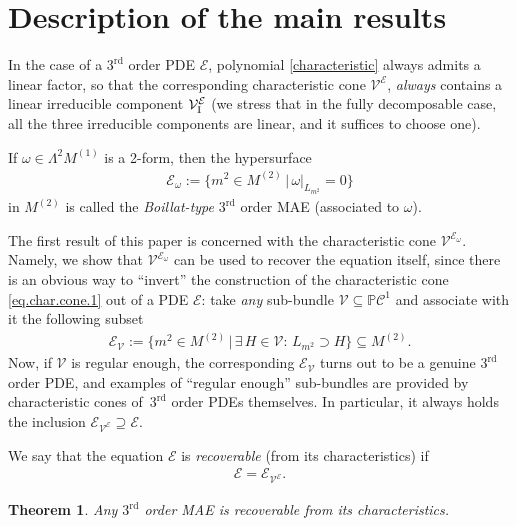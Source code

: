 \documentclass[10pt,a4paper]{amsart}
\newcommand{\C}{\mathcal{C}}
\newcommand{\M}{\mathcal{V}}
\newcommand{\MM}{\mathcal{V}_{\textrm{\normalfont I}}}
\newcommand{\E}{\mathcal{E}}
\renewcommand{\P}{\mathbb{P}}
\newcommand{\Rd}{^\textrm{rd}}
\newcommand{\elle}{H}
\numberwithin{equation}{section}
\newtheorem{Theorem}{Theorem}[section]
\begin{document}
\section{Description of the main results}\label{subDescrMainRes}

In the case of a $3\Rd$ order PDE $\E$, polynomial \eqref{characteristic} always admits a linear factor, so that the corresponding characteristic cone $\M^\E$, \emph{always} contains a linear irreducible component $\MM^\E$ (we stress that in the fully decomposable case, all the three irreducible components are linear, and it suf\/f\/ices to choose one).

\begin{Definition}
 If $\omega\in \Lambda^2 M^{(1)}$ is a 2-form, then the hypersurface
 \begin{gather}\label{eqEOmega}
\E_{\omega}:=\big\{ m^2\in M^{(2)}\,|\, \omega|_{L_{m^2}}= 0 \big\}
\end{gather}
in $M^{(2)}$ is called the \emph{Boillat-type} $3\Rd$ order MAE (associated to $\omega$).
\end{Definition}

The f\/irst result of this paper is concerned with the characteristic cone $\M^{\E_\omega}$. %
 Namely, we show that $\M^{\E_\omega}$ can be used to recover the equation itself, since there is an obvious way to ``invert'' the construction of the characteristic cone \eqref{eq.char.cone.1} out of a PDE $\E$: take \emph{any} sub-bundle $\M\subseteq\P\C^1$ and associate with it the following subset
\begin{gather}\label{eqENu}
\E_\M:=\big\{ m^2 \in M^{(2)}\,|\, \exists\,\elle\in\M\colon\, L_{m^2}\supset\elle\}\subseteq M^{(2)}.
\end{gather}
Now, if $\M$ is regular enough, the corresponding $\E_\M$ turns out to be a genuine $3\Rd$ order PDE, and examples of ``regular enough'' sub-bundles are provided by characteristic cones of~$3\Rd$ order PDEs themselves. In particular, it always holds the inclusion $\E_{\M^\E}\supseteq \E$.

\begin{Definition}\label{defMaledetta}
 We say that the equation $\E$ is \emph{recoverable} (from its characteristics) if
 \begin{gather}
\E=\E_{\M^\E}.\label{eqStar}
\end{gather}
\end{Definition}


\begin{Theorem} \label{LemmaNotturnoQuasiMattinieroPromossoATeorema}
 Any $3\Rd$ order MAE is recoverable from its characteristics.
 \end{Theorem}
\end{document}
